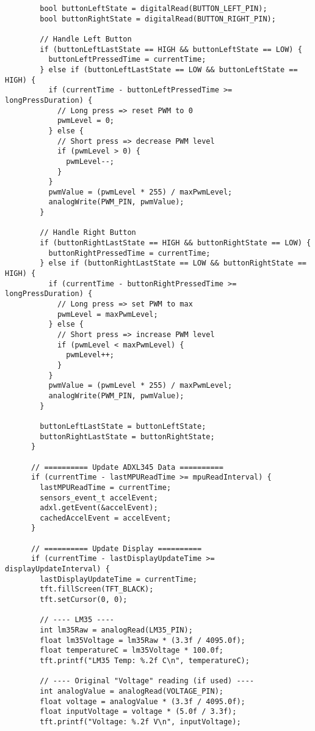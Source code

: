 \begin{verbatim}
        bool buttonLeftState = digitalRead(BUTTON_LEFT_PIN);
        bool buttonRightState = digitalRead(BUTTON_RIGHT_PIN);
    
        // Handle Left Button
        if (buttonLeftLastState == HIGH && buttonLeftState == LOW) {
          buttonLeftPressedTime = currentTime;
        } else if (buttonLeftLastState == LOW && buttonLeftState == HIGH) {
          if (currentTime - buttonLeftPressedTime >= longPressDuration) {
            // Long press => reset PWM to 0
            pwmLevel = 0;
          } else {
            // Short press => decrease PWM level
            if (pwmLevel > 0) {
              pwmLevel--;
            }
          }
          pwmValue = (pwmLevel * 255) / maxPwmLevel;
          analogWrite(PWM_PIN, pwmValue);
        }
    
        // Handle Right Button
        if (buttonRightLastState == HIGH && buttonRightState == LOW) {
          buttonRightPressedTime = currentTime;
        } else if (buttonRightLastState == LOW && buttonRightState == HIGH) {
          if (currentTime - buttonRightPressedTime >= longPressDuration) {
            // Long press => set PWM to max
            pwmLevel = maxPwmLevel;
          } else {
            // Short press => increase PWM level
            if (pwmLevel < maxPwmLevel) {
              pwmLevel++;
            }
          }
          pwmValue = (pwmLevel * 255) / maxPwmLevel;
          analogWrite(PWM_PIN, pwmValue);
        }
    
        buttonLeftLastState = buttonLeftState;
        buttonRightLastState = buttonRightState;
      }
    
      // ========== Update ADXL345 Data ==========
      if (currentTime - lastMPUReadTime >= mpuReadInterval) {
        lastMPUReadTime = currentTime;
        sensors_event_t accelEvent;
        adxl.getEvent(&accelEvent);
        cachedAccelEvent = accelEvent;
      }
    
      // ========== Update Display ==========
      if (currentTime - lastDisplayUpdateTime >= displayUpdateInterval) {
        lastDisplayUpdateTime = currentTime;
        tft.fillScreen(TFT_BLACK);
        tft.setCursor(0, 0);
    
        // ---- LM35 ----
        int lm35Raw = analogRead(LM35_PIN);
        float lm35Voltage = lm35Raw * (3.3f / 4095.0f);
        float temperatureC = lm35Voltage * 100.0f;
        tft.printf("LM35 Temp: %.2f C\n", temperatureC);
    
        // ---- Original "Voltage" reading (if used) ----
        int analogValue = analogRead(VOLTAGE_PIN);
        float voltage = analogValue * (3.3f / 4095.0f);
        float inputVoltage = voltage * (5.0f / 3.3f);
        tft.printf("Voltage: %.2f V\n", inputVoltage);
    

\end{verbatim}
